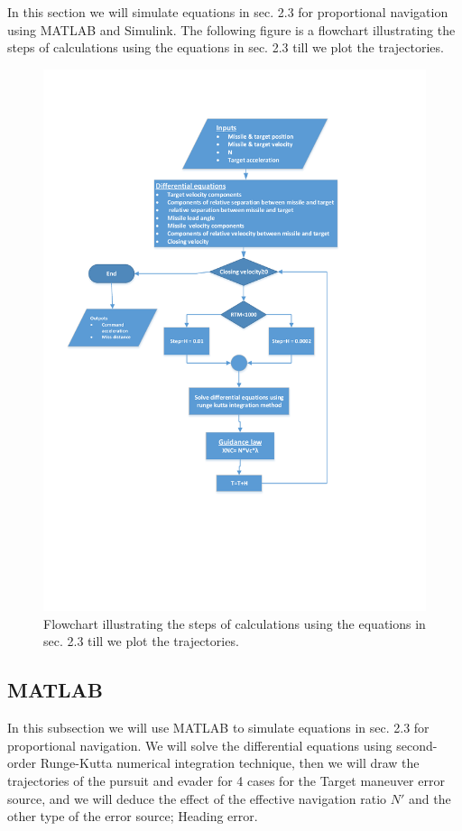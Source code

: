 In this section we will simulate equations in sec. 2.3 for proportional navigation using MATLAB and Simulink.
The following figure is a flowchart illustrating the steps of calculations using the equations in sec. 2.3  till we plot the trajectories.

\begin{figure}[htb]
	\centering
	\includegraphics[scale = 0.85]{fig/FlowchartPN.pdf}
	\caption{Flowchart illustrating the steps of calculations using the equations in sec. 2.3  till we plot the trajectories.}
	\label{flowchart PN}
\end{figure}


\subsection{MATLAB}
In this subsection we will use MATLAB to simulate equations in sec. 2.3 for proportional navigation. We will solve the differential equations using second-order Runge-Kutta numerical integration technique, then we will draw the trajectories of the pursuit and evader for 4 cases for the Target maneuver error source, and we will deduce the effect of the effective navigation ratio $N'$ and the other type of the error source; Heading error. 
